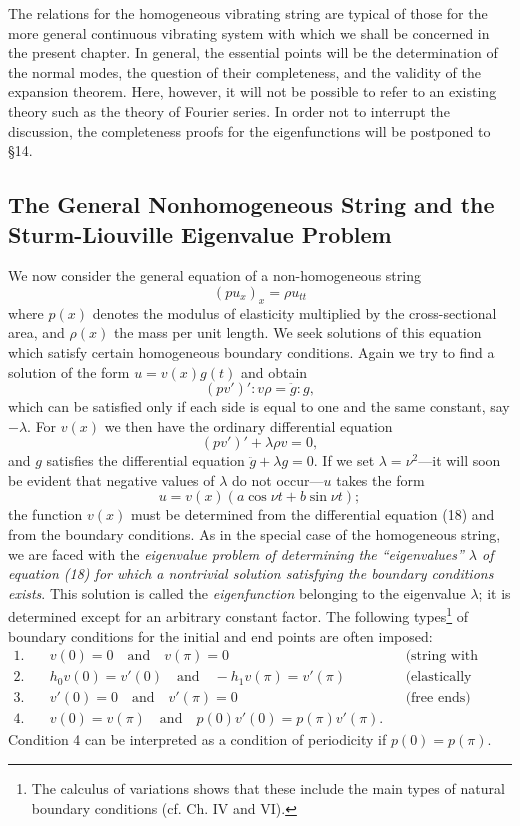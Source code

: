 The relations for the homogeneous vibrating string are typical of those for the more general continuous vibrating system with which we shall be concerned in the present chapter. In general, the essential points will be the determination of the normal modes, the question of their completeness, and the validity of the expansion theorem. Here, however, it will not be possible to refer to an existing theory such as the theory of Fourier series. In order not to interrupt the discussion, the completeness proofs for the eigenfunctions will be postponed to \S14.

\subsection{The General Nonhomogeneous String and the Sturm-Liouville Eigenvalue Problem}
We now consider the general equation of a non-homogeneous string
\[
(pu_x)_x=\rho u_{tt}
\]
where $p(x)$ denotes the modulus of elasticity multiplied by the cross-sectional area, and $\rho(x)$ the mass per unit length. We seek solutions of this equation which satisfy certain homogeneous boundary conditions. Again we try to find a solution of the form $u=v(x)g(t)$ and obtain
\[
(pv')':v\rho=\ddot g:g,
\]
which can be satisfied only if each side is equal to one and the same constant, say $-\lambda$. For $v(x)$ we then have the ordinary differential equation
\begin{equation}\tag{18}
(pv')'+\lambda\rho v=0,
\end{equation}
and $g$ satisfies the differential equation $\ddot g+\lambda g=0$. If we set $\lambda=\nu^2$---it will soon be evident that negative values of $\lambda$ do not occur---$u$ takes the form
\[
u=v(x)(a\cos\nu t+b\sin\nu t);
\]
the function $v(x)$ must be determined from the differential equation (18) and from the boundary conditions. As in the special case of the homogeneous string, we are faced with the \emph{eigenvalue problem of determining the ``eigenvalues'' $\lambda$ of equation (18) for which a nontrivial solution satisfying the boundary conditions exists}. This solution is called the \emph{eigenfunction} belonging to the eigenvalue $\lambda$; it is determined except for an arbitrary constant factor. The following types\footnote{The calculus of variations shows that these include the main types of natural boundary conditions (cf. Ch. IV and VI).} of boundary conditions for the initial and end points are often imposed:
\begin{align*}
1.\quad &v(0)=0\quad\text{and}\quad v(\pi)=0 &&\text{(string with fixed ends)}\\
2.\quad &h_0v(0)=v'(0)\quad\text{and}\quad -h_1v(\pi)=v'(\pi) &&\text{(elastically attached ends)}\\
3.\quad &v'(0)=0\quad\text{and}\quad v'(\pi)=0 &&\text{(free ends)}\\
4.\quad &v(0)=v(\pi)\quad\text{and}\quad p(0)v'(0)=p(\pi)v'(\pi).&
\end{align*}
Condition 4 can be interpreted as a condition of periodicity if $p(0)=p(\pi)$.

